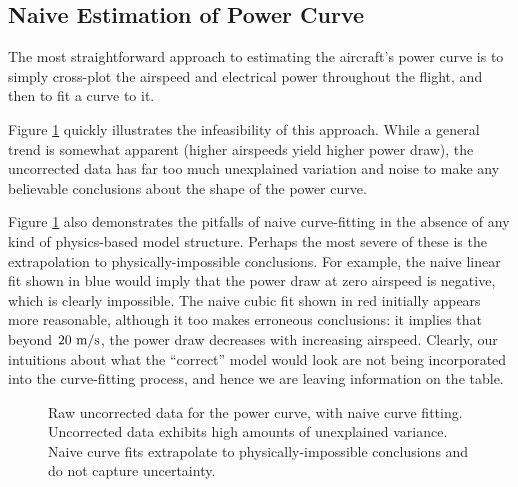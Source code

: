 \documentclass[conf]{new-aiaa}
\begin{document}
    \subsection{Naive Estimation of Power Curve}

    The most straightforward approach to estimating the aircraft's power curve is to simply cross-plot the airspeed and electrical power throughout the flight, and then to fit a curve to it.

    Figure \ref{fig:power_curve_naive} quickly illustrates the infeasibility of this approach. While a general trend is somewhat apparent (higher airspeeds yield higher power draw), the uncorrected data has far too much unexplained variation and noise to make any believable conclusions about the shape of the power curve.

    Figure \ref{fig:power_curve_naive} also demonstrates the pitfalls of naive curve-fitting in the absence of any kind of physics-based model structure. Perhaps the most severe of these is the extrapolation to physically-impossible conclusions. For example, the naive linear fit shown in blue would imply that the power draw at zero airspeed is negative, which is clearly impossible. The naive cubic fit shown in red initially appears more reasonable, although it too makes erroneous conclusions: it implies that beyond $20\ \rm m/s$, the power draw decreases with increasing airspeed. Clearly, our intuitions about what the ``correct'' model would look are not being incorporated into the curve-fitting process, and hence we are leaving information on the table.

    \begin{figure}[H]
        \centering
        \caption{Raw uncorrected data for the power curve, with naive curve fitting. Uncorrected data exhibits high amounts of unexplained variance. Naive curve fits extrapolate to physically-impossible conclusions and do not capture uncertainty.}
        \label{fig:power_curve_naive}
    \end{figure}
\end{document}
